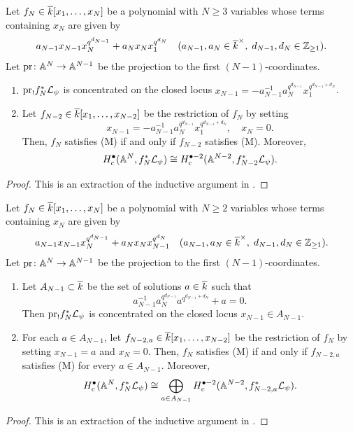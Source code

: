 \documentclass[12pt,reqno]{amsart}
\begin{document}
\begin{lem} \label{lem:reduction_N_>=3}
    Let $f_N \in {\overline{k}}[x_1, \ldots, x_N]$ be a polynomial with $N \geq 3$ variables whose terms containing $x_N$ are given by
    \[
        a_{N - 1} x_{N - 1} x_N^{q^{d_{N - 1}}} + a_N x_N x_1^{q^{d_N}} \quad (a_{N-1}, a_N \in {\overline{k}}^\times,\; d_{N-1}, d_N \in \mathbb{Z}_{\geq 1}). 
    \]
    Let ${\operatorname{pr}} \colon \mathbb{A}^N \to \mathbb{A}^{N - 1}$ be the projection to the first $(N - 1)$-coordinates. 
    \begin{enumerate}
        \item ${\operatorname{pr}}_{!} f_N^* {\mathcal{L}}_\psi$ is concentrated on the closed locus $x_{N - 1} = - a_{N - 1}^{-1} a_N^{q^{d_{N-1}}} x_1^{q^{d_{N - 1} + d_N}}$. 
        \item Let $f_{N - 2} \in {\overline{k}}[x_1, \ldots, x_{N - 2}]$ be the restriction of $f_N$ by setting
        \[
            x_{N - 1} = - a_{N - 1}^{-1} a_N^{q^{d_{N - 1}}} x_1^{q^{d_{N - 1} + d_N}}, \quad x_N = 0. 
        \]
        Then, $f_N$ satisfies (M) if and only if $f_{N - 2}$ satisfies (M). Moreover, 
        \[
            H_c^\bullet(\mathbb{A}^N, f_N^* {\mathcal{L}}_\psi) \cong H_c^{\bullet- 2}(\mathbb{A}^{N-2}, f_{N-2}^* {\mathcal{L}}_\psi). 
        \]
    \end{enumerate}
\end{lem}
\begin{proof}   
    This is an extraction of the inductive argument in \cite[Section 4.3.1]{Tak26_Yu}. 
\end{proof}

\begin{lem} \label{lem:reduction_N_=2}
    Let $f_N \in {\overline{k}}[x_1, \ldots, x_N]$ be a polynomial with $N \geq 2$ variables whose terms containing $x_N$ are given by
    \[
        a_{N - 1} x_{N - 1} x_N^{q^{d_{N - 1}}} + a_N x_N x_{N - 1}^{q^{d_N}} \quad (a_{N-1}, a_N \in {\overline{k}}^\times,\; d_{N-1}, d_N \in \mathbb{Z}_{\geq 1}). 
    \]
    Let ${\operatorname{pr}} \colon \mathbb{A}^N \to \mathbb{A}^{N - 1}$ be the projection to the first $(N - 1)$-coordinates. 
    \begin{enumerate}
        \item Let $A_{N - 1} \subset {\overline{k}}$ be the set of solutions $a \in {\overline{k}}$ such that 
        \[
            a_{N - 1}^{-1} a_N^{q^{d_{N-1}}} a^{q^{d_{N - 1} + d_N}} + a = 0. 
        \]
        Then ${\operatorname{pr}}_{!} f_N^* {\mathcal{L}}_\psi$ is concentrated on the closed locus $x_{N - 1} \in A_{N - 1}$. 
        \item For each $a \in A_{N - 1}$, let $f_{N - 2, a} \in {\overline{k}}[x_1, \ldots, x_{N - 2}]$ be the restriction of $f_N$ by setting $x_{N - 1} = a$ and $x_N = 0$. Then, $f_N$ satisfies (M) if and only if $f_{N - 2, a}$ satisfies (M) for every $a \in A_{N - 1}$. Moreover, 
        \[
            H_c^\bullet(\mathbb{A}^N, f_N^* {\mathcal{L}}_\psi) \cong \bigoplus_{a \in A_{N - 1}} H_c^{\bullet- 2}(\mathbb{A}^{N-2}, f_{N-2, a}^* {\mathcal{L}}_\psi). 
        \]
    \end{enumerate}
\end{lem}
\begin{proof}
    This is an extraction of the inductive argument in \cite[Section 4.3.2]{Tak26_Yu}. 
\end{proof}
\end{document}
